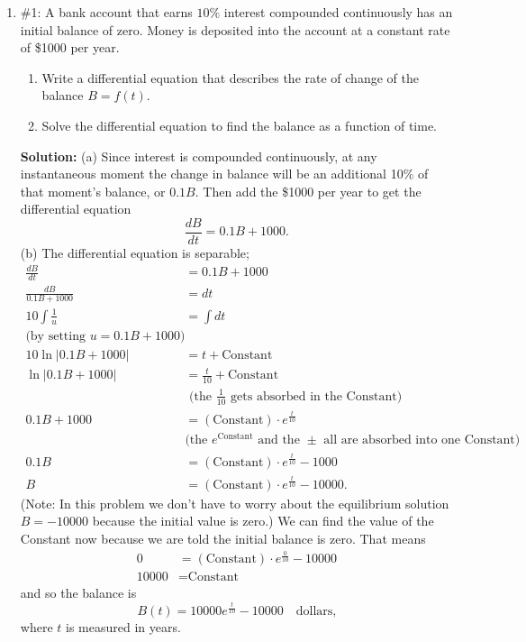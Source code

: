\documentclass[11pt,letterpaper]{article}
\begin{document}
\begin{enumerate}
\item \#1: A bank account that earns $10\%$ interest compounded continuously has an initial balance of zero.  Money is deposited into the account at a constant rate of \$1000 per year.
\begin{enumerate}
\item Write a differential equation that describes the rate of change of the balance $B=f(t)$.
\item Solve the differential equation to find the balance as a function of time.
\end{enumerate}

{\bf Solution:} (a) Since interest is compounded continuously, at any instantaneous moment the change in balance will be an additional 10\% of that moment's balance, or $0.1B$.  Then add the \$1000 per year to get the differential equation
\[\frac{dB}{dt}=0.1B+1000.\]
(b) The differential equation is separable; 
\begin{align*}
\frac{dB}{dt} &=0.1B+1000 \\
\frac{dB}{0.1B+1000} &= dt \\
10\int\frac{1}{u} &= \int dt \\
\text{(by setting $u=0.1B+1000$)} & \\
10\ln|0.1B+1000| &= t+\text{Constant} \\
\ln|0.1B+1000| &= \frac{t}{10}+\text{Constant} \\
&\text{ (the $\frac{1}{10}$ gets absorbed in the Constant)}\\
0.1B+1000 &=(\text{Constant})\cdot e^{\frac{t}{10}} \\
&\text{(the $e^{\text{Constant}}$ and the $\pm$ all are absorbed into one Constant)} \\
0.1B &=(\text{Constant})\cdot e^{\frac{t}{10}}-1000 \\
B &= (\text{Constant})\cdot e^{\frac{t}{10}}-10000.
\end{align*}
(Note:  In this problem we don't have to worry about the equilibrium solution $B=-10000$ because the initial value is zero.)  We can find the value of the Constant now because we are told the initial balance is zero.  That means
\begin{align*}
0 &= (\text{Constant})\cdot e^{\frac{0}{10}}-10000 \\
10000 &= \text{Constant}
\end{align*}
and so the balance is
\[B(t)=10000e^{\frac{t}{10}}-10000\quad\text{dollars,}\]
where $t$ is measured in years. 


\end{enumerate}
\end{document}
